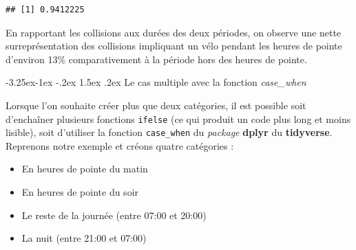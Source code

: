 \documentclass[
  11pt,
  french,
]{book}
\makeatletter
\providecommand{\tightlist}{%
  \setlength{\itemsep}{0pt}\setlength{\parskip}{0pt}}
\renewcommand\paragraph{\@startsection{paragraph}{4}{\z@}%
   {-3.25ex\@plus -1ex \@minus -.2ex}%
   {1.5ex \@plus .2ex}%
   {\normalfont\normalsize\bfseries}}
\makeatother
\begin{document}
\begin{verbatim}
## [1] 0.9412225
\end{verbatim}

En rapportant les collisions aux durées des deux périodes, on observe une nette surreprésentation des collisions impliquant un vélo pendant les heures de pointe d'environ 13\% comparativement à la période hors des heures de pointe.

\hypertarget{sect014272}{%
\paragraph{\texorpdfstring{Le cas multiple avec la fonction \emph{case\_when}}{Le cas multiple avec la fonction case\_when}}\label{sect014272}}

Lorsque l'on souhaite créer plus que deux catégories, il est possible soit d'enchaîner plusieurs fonctions \texttt{ifelse} (ce qui produit un code plus long et moins lisible), soit d'utiliser la fonction \texttt{case\_when} du \emph{package} \textbf{dplyr} du \textbf{tidyverse}. Reprenons notre exemple et créons quatre catégories :

\begin{itemize}
\tightlist
\item
  En heures de pointe du matin
\item
  En heures de pointe du soir
\item
  Le reste de la journée (entre 07:00 et 20:00)
\item
  La nuit (entre 21:00 et 07:00)
\end{itemize}
\end{document}

